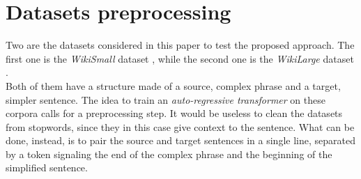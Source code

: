 \section{Datasets preprocessing}\label{sect:dataset}
Two are the datasets considered in this paper to test the proposed approach.
The first one is the \textit{WikiSmall} dataset \cite{D17-1063}, 
while the second one is the \textit{WikiLarge} dataset \cite{D17-1063}. \\
Both of them have a structure made of a source, complex phrase and a target, simpler sentence.
The idea to train an \textit{auto-regressive transformer} on these corpora calls for a preprocessing step.
It would be useless to clean the datasets from stopwords, since they in this case give context to the sentence.
What can be done, instead, is to pair the source and target sentences in a single line, 
separated by a token signaling the end of the complex phrase and the beginning of the simplified sentence.